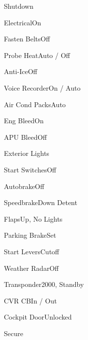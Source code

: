 \documentclass[sim-use]{checklist}
\begin{document}
\begin{checklist}{Shutdown}
  \item{Electrical}{On \blank}
  \item{Fasten Belts}{Off}
  \item{Probe Heat}{Auto / Off}
  \item{Anti-Ice}{Off}
  \item{Voice Recorder}{On / Auto}
  \item{Air Cond Packs}{Auto}
  \item{Eng Bleed}{On}
  \item{APU Bleed}{Off}
  \item{Exterior Lights}{\blank}
\end{checklist}

\begin{continuedchecklist}
  \item{Start Switches}{Off}
  \item{Autobrake}{Off}
  \item{Speedbrake}{Down Detent}
  \item{Flaps}{Up, No Lights}
  \item{Parking Brake}{Set}
  \item{Start Levers}{Cutoff}
  \item{Weather Radar}{Off}
  \item{Transponder}{2000, Standby}
  \item{CVR CB}{In / Out}
  \item{Cockpit Door}{Unlocked}
\end{continuedchecklist}

\begin{checklist}{Secure}
\end{checklist}

\clearpage
\end{document}
